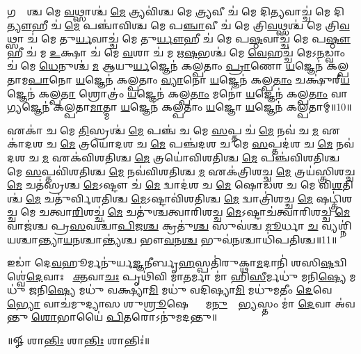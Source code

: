𑌗𑌰𑍍𑌭𑌾᳚𑌶𑍍𑌚 𑌮𑍇 \ul{𑌵}𑌥𑍍𑌸𑌾𑌶𑍍𑌚॑ \ul{𑌮𑍇} 𑌤𑍍𑌰𑍍𑌯𑌵𑌿॑𑌶𑍍𑌚 𑌮𑍇 \ul{𑌤𑍍𑌰𑍍𑌯}𑌵𑍀 𑌚॑ 𑌮𑍇 𑌦𑌿\ul{𑌤𑍍𑌯}𑌵𑌾𑌚𑍍𑌚॑ 𑌮𑍇 𑌦𑌿\ul{𑌤𑍍𑌯𑍗}𑌹𑍀 𑌚॑ \ul{𑌮𑍇} 𑌪𑌞𑍍𑌚𑌾॑𑌵𑌿𑌶𑍍𑌚 𑌮𑍇 𑌪\ul{𑌞𑍍𑌚𑌾}𑌵𑍀 𑌚॑ 𑌮𑍇 𑌤𑍍𑌰𑌿\ul{𑌵}𑌥𑍍𑌸𑌶𑍍𑌚॑ 𑌮𑍇 𑌤𑍍𑌰𑌿\ul{𑌵}𑌥𑍍𑌸𑌾 𑌚॑ 𑌮𑍇 𑌤𑍁\ul{𑌰𑍍𑌯}𑌵𑌾𑌚𑍍𑌚॑ 𑌮𑍇 𑌤𑍁\ul{𑌰𑍍𑌯𑍗}𑌹𑍀 𑌚॑ 𑌮𑍇 𑌪\ul{𑌷𑍍𑌠}𑌵𑌾𑌚𑍍𑌚॑ 𑌮𑍇 𑌪\ul{𑌷𑍍𑌠𑍗}𑌹𑍀 𑌚॑ 𑌮 \ul{𑌉}𑌕𑍍𑌷𑌾 𑌚॑ 𑌮𑍇 \ul{𑌵}𑌶𑌾 𑌚॑ 𑌮 𑌋\ul{𑌷}𑌭𑌶𑍍𑌚॑ 𑌮𑍇 \ul{𑌵𑍇}𑌹𑌚𑍍𑌚॑ 𑌮𑍇𑌽\ul{𑌨}𑌡𑍍𑌵𑌾𑌂 𑌚॑ 𑌮𑍇 \ul{𑌧𑍇}𑌨𑍁𑌶𑍍𑌚॑ \ul{𑌮} 𑌆𑌯𑍁\ul{𑌰𑍍𑌯}𑌜𑍍𑌞𑍇𑌨॑ 𑌕𑌲𑍍𑌪𑌤𑌾𑌂 \ul{𑌪𑍍𑌰𑌾}𑌣𑍋 \ul{𑌯}𑌜𑍍𑌞𑍇𑌨॑ 𑌕𑌲𑍍𑌪𑌤𑌾𑌮\ul{𑌪𑌾}𑌨𑍋 \ul{𑌯}𑌜𑍍𑌞𑍇𑌨॑ 𑌕𑌲𑍍𑌪𑌤𑌾𑌂 \ul{𑌵𑍍𑌯𑌾}𑌨𑍋 \ul{𑌯}𑌜𑍍𑌞𑍇𑌨॑ 𑌕𑌲𑍍𑌪\ul{𑌤𑌾𑌂} 𑌚𑌕𑍍𑌷𑍁॑𑌰𑍍‌\ul{𑌯}𑌜𑍍𑌞𑍇𑌨॑ 𑌕𑌲𑍍𑌪\ul{𑌤𑌾}\ul{} 𑌶𑍍𑌰𑍋𑌤𑍍𑌰𑌂॑ \ul{𑌯}𑌜𑍍𑌞𑍇𑌨॑ 𑌕𑌲𑍍𑌪\ul{𑌤𑌾𑌂} 𑌮𑌨𑍋॑ \ul{𑌯}𑌜𑍍𑌞𑍇𑌨॑ 𑌕𑌲𑍍𑌪\ul{𑌤𑌾𑌂} 𑌵𑌾\ul{𑌗𑍍𑌯}𑌜𑍍𑌞𑍇𑌨॑ 𑌕𑌲𑍍𑌪𑌤𑌾\ul{𑌮𑌾}𑌤𑍍𑌮𑌾 \ul{𑌯}𑌜𑍍𑌞𑍇𑌨॑ 𑌕𑌲𑍍𑌪𑌤𑌾𑌂 \ul{𑌯}𑌜𑍍𑌞𑍋 \ul{𑌯}𑌜𑍍𑌞𑍇𑌨॑ 𑌕𑌲𑍍𑌪𑌤𑌾𑌮𑍍॥10॥ 

𑌏𑌕𑌾॑ 𑌚 𑌮𑍇 \ul{𑌤𑌿}𑌸𑍍𑌰𑌶𑍍𑌚॑ \ul{𑌮𑍇} 𑌪𑌞𑍍𑌚॑ 𑌚 𑌮𑍇 \ul{𑌸}𑌪𑍍𑌤 𑌚॑ \ul{𑌮𑍇} 𑌨𑌵॑ 𑌚 \ul{𑌮} 𑌏𑌕𑌾॑𑌦𑌶 𑌚 \ul{𑌮𑍇} 𑌤𑍍𑌰𑌯𑍋॑𑌦𑌶 𑌚 \ul{𑌮𑍇} 𑌪𑌞𑍍𑌚॑𑌦𑌶 𑌚 𑌮𑍇 \ul{𑌸}𑌪𑍍𑌤𑌦॑𑌶 𑌚 \ul{𑌮𑍇} 𑌨𑌵॑𑌦𑌶 𑌚 \ul{𑌮} 𑌏𑌕॑𑌵𑌿𑌶𑌤𑌿𑌶𑍍𑌚 \ul{𑌮𑍇} 𑌤𑍍𑌰𑌯𑍋॑𑌵𑌿𑌶𑌤𑌿𑌶𑍍𑌚 \ul{𑌮𑍇} 𑌪𑌞𑍍𑌚॑𑌵𑌿𑌶𑌤𑌿𑌶𑍍𑌚 𑌮𑍇 \ul{𑌸}𑌪𑍍𑌤𑌵𑌿॑𑌶𑌤𑌿𑌶𑍍𑌚 \ul{𑌮𑍇} 𑌨𑌵॑𑌵𑌿𑌶𑌤𑌿𑌶𑍍𑌚 \ul{𑌮} 𑌏𑌕॑𑌤𑍍𑌰𑌿𑌶𑌚𑍍𑌚 \ul{𑌮𑍇} 𑌤𑍍𑌰𑌯॑𑌸𑍍𑌤𑍍𑌰𑌿𑌶𑌚𑍍𑌚 \ul{𑌮𑍇} 𑌚𑌤॑𑌸𑍍𑌰𑌶𑍍𑌚 \ul{𑌮𑍇}𑌽𑌷𑍍𑌟𑍗 𑌚॑ \ul{𑌮𑍇} 𑌦𑍍𑌵𑌾𑌦॑𑌶 𑌚 \ul{𑌮𑍇} 𑌷𑍋𑌡॑𑌶 𑌚 𑌮𑍇 𑌵𑌿\ul{𑌶}𑌤𑌿𑌶𑍍𑌚॑ \ul{𑌮𑍇} 𑌚𑌤𑍁॑𑌰𑍍𑌵𑌿𑌶𑌤𑌿𑌶𑍍𑌚 \ul{𑌮𑍇}𑌽𑌷𑍍𑌟𑌾𑌵𑌿॑𑌶𑌤𑌿𑌶𑍍𑌚 \ul{𑌮𑍇} 𑌦𑍍𑌵𑌾𑌤𑍍𑌰𑌿॑𑌶𑌚𑍍𑌚 \ul{𑌮𑍇} 𑌷𑌟𑍍𑌤𑍍𑌰𑌿॑𑌶𑌚𑍍𑌚 𑌮𑍇 𑌚𑌤𑍍𑌵𑌾\ul{𑌰𑌿}\ul{}𑌶𑌚𑍍𑌚॑ \ul{𑌮𑍇} 𑌚𑌤𑍁॑𑌶𑍍𑌚𑌤𑍍𑌵𑌾𑌰𑌿𑌶𑌚𑍍𑌚 \ul{𑌮𑍇}𑌽𑌷𑍍𑌟𑌾𑌚॑𑌤𑍍𑌵𑌾𑌰𑌿𑌶𑌚𑍍𑌚 \ul{𑌮𑍇} 𑌵𑌾𑌜॑𑌶𑍍𑌚 𑌪𑍍𑌰\ul{𑌸}𑌵𑌶𑍍𑌚𑌾॑\ul{𑌪𑌿}𑌜\ul{𑌶𑍍𑌚} 𑌕𑍍𑌰𑌤𑍁॑\ul{𑌶𑍍𑌚} 𑌸𑍁𑌵॑𑌶𑍍𑌚 \ul{𑌮𑍂}𑌰𑍍𑌧𑌾 \ul{𑌚} 𑌵𑍍𑌯𑌶𑍍𑌨𑌿॑𑌯𑌶𑍍𑌚𑌾𑌨𑍍𑌤𑍍𑌯𑌾\ul{𑌯}𑌨𑌶𑍍𑌚𑌾𑌨𑍍𑌤𑍍𑌯॑𑌶𑍍𑌚 𑌭𑍗\ul{𑌵}𑌨\ul{𑌶𑍍𑌚} 𑌭𑍁𑌵॑\ul{𑌨}𑌶𑍍𑌚𑌾𑌧𑌿॑𑌪𑌤𑌿𑌶𑍍𑌚॥11॥ 

𑌇𑌡𑌾॑ 𑌦𑍇\ul{𑌵}𑌹𑍂𑌰𑍍𑌮𑌨𑍁॑𑌰𑍍𑌯\ul{𑌜𑍍𑌞}𑌨𑍀𑌰𑍍𑌬𑍃\ul{𑌹}𑌸𑍍𑌪𑌤𑌿॑𑌰𑍁𑌕𑍍𑌥𑌾\ul{𑌮}𑌦𑌾𑌨𑌿॑ 𑌶𑌸𑌿\ul{𑌷}𑌦𑍍𑌵𑌿𑌶𑍍𑌵𑍇॑\ul{𑌦𑍇}𑌵𑌾𑌃 𑌸𑍂᳚\ul{𑌕𑍍𑌤}𑌵𑌾\ul{𑌚𑌃} 𑌪𑍃𑌥𑌿॑𑌵𑌿 𑌮𑌾\ul{𑌤}𑌰𑍍𑌮𑌾 𑌮𑌾॑ 𑌹𑌿\ul{𑌸𑍀}𑌰𑍍𑌮𑌧𑍁॑ 𑌮𑌨𑌿\ul{𑌷𑍍𑌯𑍇} 𑌮𑌧𑍁॑ 𑌜𑌨𑌿\ul{𑌷𑍍𑌯𑍇} 𑌮𑌧𑍁॑ 𑌵𑌕𑍍𑌷𑍍𑌯𑌾\ul{𑌮𑌿} 𑌮𑌧𑍁॑ 𑌵𑌦𑌿𑌷𑍍𑌯𑌾\ul{𑌮𑌿} 𑌮𑌧𑍁॑𑌮𑌤𑍀𑌂 \ul{𑌦𑍇}𑌵𑍇\ul{𑌭𑍍𑌯𑍋} 𑌵𑌾𑌚॑𑌮𑍁𑌦𑍍𑌯𑌾𑌸 𑌶𑍁\ul{𑌶𑍍𑌰𑍂}𑌷𑍇𑌣𑍍𑌯𑌾𑌂᳚ 𑌮\ul{𑌨𑍁}𑌷𑍍𑌯𑍇᳚\ul{𑌭𑍍𑌯}𑌸𑍍𑌤𑌂 𑌮𑌾॑ \ul{𑌦𑍇}𑌵𑌾 𑌅॑𑌵𑌨𑍍𑌤𑍁 \ul{𑌶𑍋}𑌭𑌾𑌯𑍈॑ \ul{𑌪𑌿}𑌤𑌰𑍋𑌽𑌨𑍁॑𑌮𑌦𑌨𑍍𑌤𑍁॥ 

\centerline{॥𑍐 𑌶𑌾\ul{𑌨𑍍𑌤𑌿𑌃} 𑌶𑌾\ul{𑌨𑍍𑌤𑌿𑌃} 𑌶𑌾𑌨𑍍𑌤𑌿𑌃॑॥}


